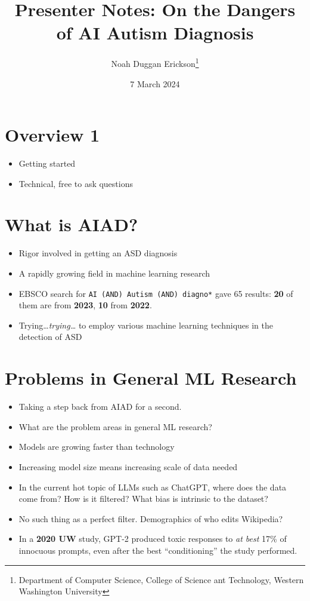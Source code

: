 \documentclass[twoside, letterpaper, twocolumn]{article}
\title{Presenter Notes: On the Dangers of AI Autism Diagnosis}
\author{Noah Duggan Erickson\thanks{Department of Computer Science, College of Science ant Technology, Western Washington University}}
\date{7 March 2024}
\begin{document}
\maketitle
\section{Overview 1}
\begin{itemize}
    \item Getting started
    \item Technical, free to ask questions
\end{itemize}
\section{What is AIAD?}
\begin{itemize}
    \item Rigor involved in getting an ASD diagnosis
    \item A rapidly growing field in machine learning research
    \item EBSCO search for \texttt{AI (AND) Autism (AND) diagno*} gave 65 results: \textbf{20} of them are from \textbf{2023}, \textbf{10} from \textbf{2022}.
    \item Trying\dots \textit{trying\dots} to employ various machine learning techniques in the detection of ASD
\end{itemize}
\newpage
\section{Problems in General ML Research}
\begin{itemize}
    \item Taking a step back from AIAD for a second.
    \item What are the problem areas in general ML research?
    \item Models are growing faster than technology
    \item Increasing model size means increasing scale of data needed
    \item In the current hot topic of LLMs such as ChatGPT, where does the data come from? How is it filtered? What bias is intrinsic to the dataset? 
    \item No such thing as a perfect filter. Demographics of who edits Wikipedia?
    \item In a \textbf{2020 UW} study, GPT-2 produced toxic responses to \textit{at best} 17\% of innocuous prompts, even after the best ``conditioning'' the study performed.
\end{itemize}
\end{document}
